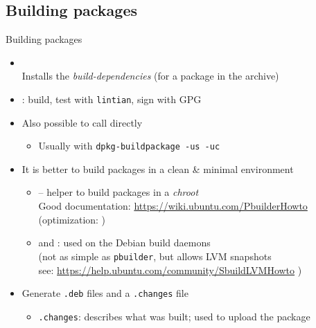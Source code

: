 \documentclass[10pt,final]{beamer}
\begin{document}
\subsection{Building packages}
\begin{frame}{Building packages}
  \begin{itemize}
  \item {}\\
    Installs the \textsl{build-dependencies} (for a package in the archive)
    
    \br
  \item {}: build, test with \texttt{lintian}, sign with GPG
    \br
  \item Also possible to call  directly
    \begin{itemize}
    \item Usually with \texttt{dpkg-buildpackage -us -uc}
    \end{itemize}
    \br
  \item It is better to build packages in a clean \& minimal environment
    \begin{itemize}
    \item {} -- helper to build packages in a \textsl{chroot}\\
      Good documentation: \url{https://wiki.ubuntu.com/PbuilderHowto}\\
      (optimization:   )
      \hbr
    \item {} and : used on the Debian build daemons\\
      (not as simple as \texttt{pbuilder}, but allows LVM snapshots\\
       see: \url{https://help.ubuntu.com/community/SbuildLVMHowto} )
    \end{itemize}
    \br
  \item Generate \texttt{.deb} files and a \texttt{.changes} file
    \begin{itemize}
    \item \texttt{.changes}: describes what was built; used to upload the package
    \end{itemize}
  \end{itemize}
\end{frame}
\end{document}
